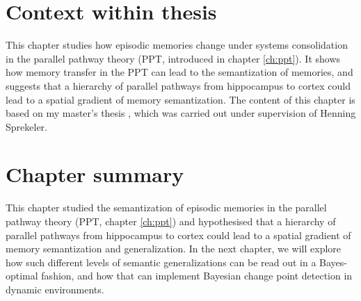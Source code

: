 



\graphicspath{{chapter_PPT_semantization/figures/}}

\section{Context within thesis}
This chapter studies how episodic memories change under systems consolidation in the parallel pathway theory (PPT, introduced in chapter \ref{ch:ppt}). It shows how memory transfer in the PPT can lead to the semantization of memories, and suggests that a hierarchy of parallel pathways from hippocampus to cortex could lead to a spatial gradient of memory semantization. The content of this chapter is based on my master's thesis \cite{Alevi2019,Alevi2019a}, which was carried out under supervision of Henning Sprekeler.

%
%
%
%

\section{Chapter summary}

This chapter studied the semantization of episodic memories in the parallel pathway theory (PPT, chapter \ref{ch:ppt}) and hypothesised that a hierarchy of parallel pathways from hippocampus to cortex could lead to a spatial gradient of memory semantization and generalization. In the next chapter, we will explore how such different levels of semantic generalizations can be read out in a Bayes-optimal fashion, and how that can implement Bayesian change point detection in dynamic environments.


